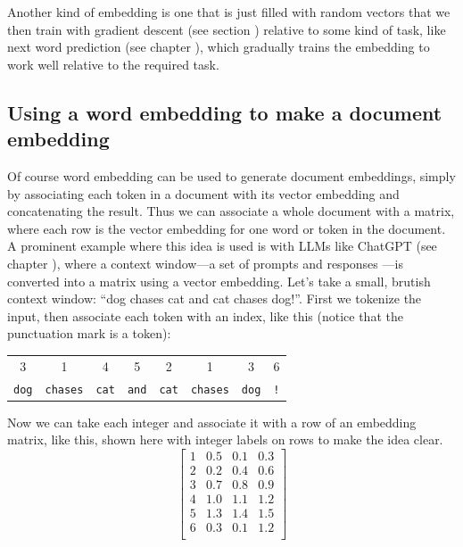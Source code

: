 Another kind of embedding is one that is just filled with random vectors that we then train with gradient descent (see section ) relative to some kind of task, like next word prediction (see chapter ), which gradually trains the embedding to work well relative to the required task.

\subsection{Using a word embedding to make a document embedding}\label{wordEmbeddingMatrix}

Of course word embedding can be used to generate document embeddings, simply by associating each token in  a document with its vector embedding and concatenating the result. Thus we can associate a whole document with a matrix, where each row is the vector embedding for one word or token in the document. A prominent example where this idea is used is with LLMs like ChatGPT (see chapter ), where a context window---a set of prompts and responses ---is converted into a matrix using a vector embedding. Let's take a small, brutish context window:  ``dog chases cat and cat chases dog!''.  First we tokenize the input, then associate each token with an index, like this (notice that the punctuation mark is a token):

\begin{center}
\begin{tabular}{c@{}c@{}c@{}c@{}c@{}c@{}c@{}c}
   3 & 1 & 4 & 5 & 2 & 1 & 3 & \hspace{0.5cm}6 \\
   \texttt{dog} & \texttt{\quad chases} & \texttt{\quad cat} & \texttt{\quad and} & \texttt{\quad cat} & \texttt{\quad chases} & \texttt{\quad dog} & \texttt{\quad !} \\
\end{tabular}
\end{center}

Now we can take each integer and associate it with a row of an embedding matrix, like this, shown here with integer labels on rows to make the idea clear.
\[
\left[\begin{array}{c|ccc}
    1 & 0.5 & 0.1 & 0.3 \\
    2 & 0.2 & 0.4 & 0.6 \\
    3 & 0.7 & 0.8 & 0.9 \\
    4 & 1.0 & 1.1 & 1.2 \\
    5 & 1.3 & 1.4 & 1.5 \\
    6 & 0.3 & 0.1 & 1.2 \\
\end{array}\right]
\]

